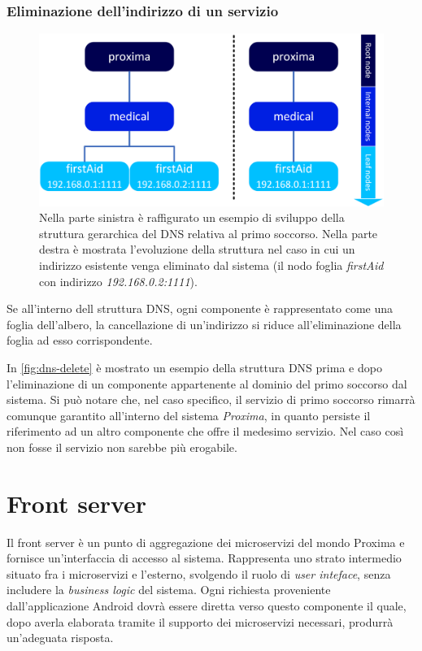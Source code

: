 \documentclass[a4paper,12pt]{report}
\begin{document}
\subsubsection{Eliminazione dell'indirizzo di un servizio}
\begin{figure}[H]
	\centering
	\includegraphics[scale=0.7]{./img/dns-delete.png}
	\caption{Nella parte sinistra è raffigurato un esempio di sviluppo della struttura gerarchica del DNS relativa al primo soccorso. Nella parte destra è mostrata l'evoluzione della struttura nel caso in cui un indirizzo esistente venga eliminato dal sistema (il nodo foglia \emph{firstAid} con indirizzo \emph{192.168.0.2:1111}). }
	\label{fig:dns-delete}
\end{figure}
Se all'interno dell struttura DNS, ogni componente è rappresentato come una foglia dell'albero, la cancellazione di un'indirizzo si riduce all'eliminazione della foglia ad esso corrispondente. 

In \autoref{fig:dns-delete} è mostrato un esempio della struttura DNS prima e dopo l'eliminazione di un componente appartenente al dominio del primo soccorso dal sistema. Si può notare che, nel caso specifico, il servizio di primo soccorso rimarrà comunque garantito all'interno del sistema \emph{Proxima}, in quanto persiste il riferimento ad un altro componente che offre il medesimo servizio. Nel caso così non fosse il servizio non sarebbe più erogabile.

\section{Front server}
Il front server è un punto di aggregazione dei microservizi del mondo Proxima e fornisce un'interfaccia di accesso al sistema. Rappresenta uno strato intermedio situato fra i microservizi e l'esterno, svolgendo il ruolo di \emph{user inteface}, senza includere la \emph{business logic} del sistema. Ogni richiesta proveniente dall'applicazione Android dovrà essere diretta verso questo componente il quale, dopo averla elaborata tramite il supporto dei microservizi necessari, produrrà un'adeguata risposta.
\end{document}
